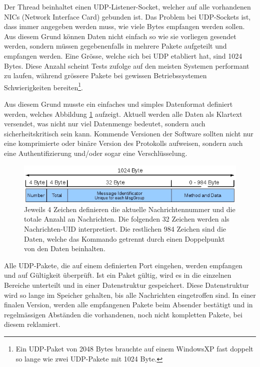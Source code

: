 Der Thread beinhaltet einen UDP-Listener-Socket, welcher auf alle vorhandenen NICs (Network Interface Card) gebunden ist. Das Problem bei UDP-Sockets ist, dass immer angegeben werden muss, wie viele Bytes empfangen werden sollen. Aus diesem Grund k\"onnen Daten nicht einfach so wie sie vorliegen gesendet werden, sondern m\"ussen gegebenenfalls in mehrere Pakete aufgeteilt und empfangen werden. Eine Gr\"osse, welche sich bei UDP etabliert hat, sind 1024 Bytes. Diese Anzahl scheint Tests zufolge auf den meisten Systemen performant zu laufen, w\"ahrend gr\"ossere Pakete bei gewissen Betriebssystemen Schwierigkeiten bereiten\footnote{Ein UDP-Paket von 2048 Bytes brauchte auf einem WindowsXP fast doppelt so lange wie zwei UDP-Pakete mit 1024 Byte.}.

Aus diesem Grund musste ein einfaches und simples Datenformat definiert werden, welches Abbildung \ref{fig:praxis-basis-kernel-listener-format} aufzeigt. Aktuell werden alle Daten als Klartext versendet, was nicht nur viel Datenmenge bedeutet, sondern auch sicherheitskritisch sein kann. Kommende Versionen der Software sollten nicht nur eine komprimierte oder bin\"are Version des Protokolls aufweisen, sondern auch eine Authentifizierung und/oder sogar eine Verschl\"usselung.

\begin{figure}[h]
  \centering
  \includegraphics[width=0.8\linewidth]{images/theorie/Aufbau_Kommunikation_Format}
  \caption[Datenformat einer AMoDS-Meldung]{Jeweils 4 Zeichen definieren die aktuelle Nachrichtennummer und die totale Anzahl an Nachrichten. Die folgenden 32 Zeichen werden als Nachrichten-UID interpretiert. Die restlichen 984 Zeichen sind die Daten, welche das Kommando getrennt durch einen Doppelpunkt von den Daten beinhalten.}
  \label{fig:praxis-basis-kernel-listener-format}
\end{figure}

Alle UDP-Pakete, die auf einem definierten Port eingehen, werden empfangen und auf G\"ultigkeit \"uberpr\"uft. Ist ein Paket g\"ultig, wird es in die einzelnen Bereiche unterteilt und in einer Datenstruktur gespeichert. Diese Datenstruktur wird so lange im Speicher gehalten, bis alle Nachrichten eingetroffen sind. In einer finalen Version, werden alle empfangenen Pakete beim Absender best\"atigt und in regelm\"assigen Abst\"anden die vorhandenen, noch nicht kompletten Pakete, bei diesem reklamiert.

